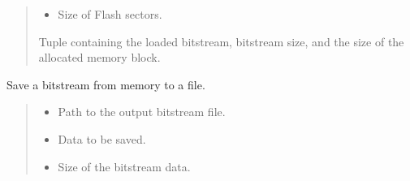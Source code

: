 \documentclass[letterpaper,10pt,english]{sphinxmanual}
\begin{document}
\begin{fulllineitems}
\begin{fulllineitems}
\begin{quote}
\begin{description}
\begin{itemize}
\item {} 
\sphinxAtStartPar
{} \textendash{} Size of Flash sectors.

\end{itemize}

\sphinxAtStartPar
Tuple containing the loaded bitstream, bitstream size, and the size of the allocated memory block.

\end{description}\end{quote}

\end{fulllineitems}


\begin{fulllineitems}
\label{\detokenize{cplddocs:management_flash.MngProgFlash.saveBitstream}}
\pysigstartsignatures
{}
\pysigstopsignatures
\sphinxAtStartPar
Save a bitstream from memory to a file.
\begin{quote}\begin{description}
\begin{itemize}
\item {} 
\sphinxAtStartPar
{} \textendash{} Path to the output bitstream file.

\item {} 
\sphinxAtStartPar
{} \textendash{} Data to be saved.

\item {} 
\sphinxAtStartPar
{} \textendash{} Size of the bitstream data.

\end{itemize}

\end{description}\end{quote}

\end{fulllineitems}



\end{fulllineitems}
\end{document}
